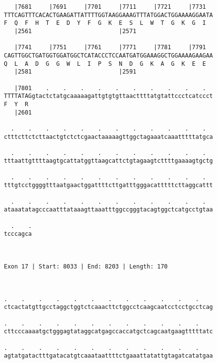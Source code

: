 \documentclass{article}
\begin{document}
\begin{Verbatim}
   |7681     |7691     |7701     |7711     |7721     |7731  
TTTCAGTTTCACACTGAAGATTATTTTGGTAAGGAAAGTTTATGGACTGGAAAAGGAATA
F  Q  F  H  T  E  D  Y  F  G  K  E  S  L  W  T  G  K  G  I  
   |2561                         |2571                      
  
   |7741     |7751     |7761     |7771     |7781     |7791  
CAGTTGGCTGATGGTGGATGGCTCATACCCTCCAATGATGGAAAGGCTGGAAAAGAAGAA
Q  L  A  D  G  G  W  L  I  P  S  N  D  G  K  A  G  K  E  E  
   |2581                         |2591                      
  
   |7801    .    .    .    .    .    .    .    .    .    .  
TTTTATAGgtactctatgcaaaaagattgtgtgttaacttttatgtattccctcatccct
F  Y  R                                                     
   |2601                                                    
  
  .    .    .    .    .    .    .    .    .    .    .    .  
ctttcttctcttaactgtctctcgaactaaaaagttggctagaaatcaaatttttatgca
                                                            
  .    .    .    .    .    .    .    .    .    .    .    .  
tttaattgttttaagtgcattatggttaagcattctgtagaagtcttttgaaaagtgctg
                                                            
  .    .    .    .    .    .    .    .    .    .    .    .  
tttgtcctggggtttaatgaactggattttcttgatttgggacatttttcttaggcattt
                                                            
  .    .    .    .    .    .    .    .    .    .    .    .  
ataaatatagcccaatttataaagttaaatttggccgggtacagtggctcatgcctgtaa
                                                            
  .    .
tcccagca
        
        
 
Exon 17 | Start: 8033 | End: 8203 | Length: 170



.    .    .    .    .    .    .    .    .    .    .    .    
ctcactatgttgcctaggctggtctcaaacttctggcctcaagcaatcctcctgcctcag
                                                            
.    .    .    .    .    .    .    .    .    .    .    .    
cttcccaaaatgctgggagtataggcatgagccaccatgctcagcaatgaagtttttatc
                                                            
.    .    .    .    .    .    .    .    .    .    .    .    
agtatgatactttgatacatgtcaaataattttctgaaattatattgtagatcatatgaa
                                                            

\end{Verbatim}
\end{document}
